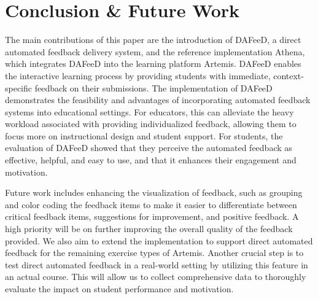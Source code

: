 \documentclass[manuscript,screen,review]{acmart}
\begin{document}
\section{Conclusion \& Future Work} %
\label{sec:conclusion}

The main contributions of this paper are the introduction of DAFeeD, a direct automated feedback delivery system, and the reference implementation Athena, which integrates DAFeeD into the learning platform Artemis.
DAFeeD enables the interactive learning process by providing students with immediate, context-specific feedback on their submissions.
The implementation of DAFeeD demonstrates the feasibility and advantages of incorporating automated feedback systems into educational settings. 
For educators, this can alleviate the heavy workload associated with providing individualized feedback, allowing them to focus more on instructional design and student support.
For students, the evaluation of DAFeeD showed that they perceive the automated feedback as effective, helpful, and easy to use, and that it enhances their engagement and motivation.

% 
Future work includes enhancing the visualization of feedback, such as grouping and color coding the feedback items to make it easier to differentiate between critical feedback items, suggestions for improvement, and positive feedback.
A high priority will be on further improving the overall quality of the feedback provided. 
We also aim to extend the implementation to support direct automated feedback for the remaining exercise types of Artemis.
Another crucial step is to test direct automated feedback in a real-world setting by utilizing this feature in an actual course. 
This will allow us to collect comprehensive data to thoroughly evaluate the impact on student performance and motivation.




\end{document}
